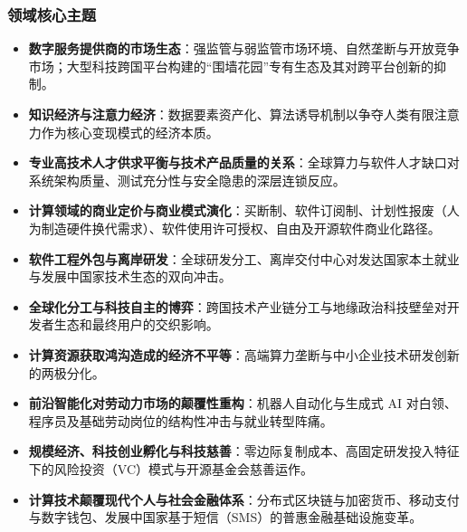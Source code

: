 \subsubsection{领域核心主题}
\begin{itemize}
    \item \textbf{数字服务提供商的市场生态}：强监管与弱监管市场环境、自然垄断与开放竞争市场；大型科技跨国平台构建的“围墙花园”专有生态及其对跨平台创新的抑制。
    \item \textbf{知识经济与注意力经济}：数据要素资产化、算法诱导机制以争夺人类有限注意力作为核心变现模式的经济本质。
    \item \textbf{专业高技术人才供求平衡与技术产品质量的关系}：全球算力与软件人才缺口对系统架构质量、测试充分性与安全隐患的深层连锁反应。
    \item \textbf{计算领域的商业定价与商业模式演化}：买断制、软件订阅制、计划性报废（人为制造硬件换代需求）、软件使用许可授权、自由及开源软件商业化路径。
    \item \textbf{软件工程外包与离岸研发}：全球研发分工、离岸交付中心对发达国家本土就业与发展中国家技术生态的双向冲击。
    \item \textbf{全球化分工与科技自主的博弈}：跨国技术产业链分工与地缘政治科技壁垒对开发者生态和最终用户的交织影响。
    \item \textbf{计算资源获取鸿沟造成的经济不平等}：高端算力垄断与中小企业技术研发创新的两极分化。
    \item \textbf{前沿智能化对劳动力市场的颠覆性重构}：机器人自动化与生成式 AI 对白领、程序员及基础劳动岗位的结构性冲击与就业转型阵痛。
    \item \textbf{规模经济、科技创业孵化与科技慈善}：零边际复制成本、高固定研发投入特征下的风险投资（VC）模式与开源基金会慈善运作。
    \item \textbf{计算技术颠覆现代个人与社会金融体系}：分布式区块链与加密货币、移动支付与数字钱包、发展中国家基于短信（SMS）的普惠金融基础设施变革。
\end{itemize}


